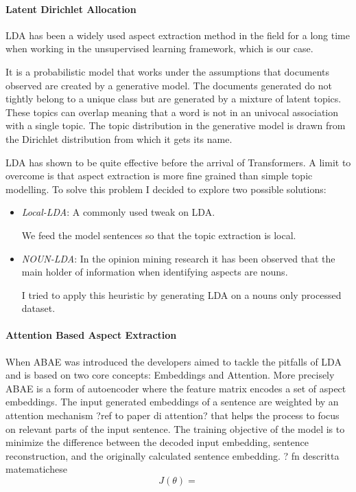 \paragraph{Latent Dirichlet Allocation}
LDA has been a widely used aspect extraction method in the field for a long time when working in the unsupervised
learning framework, which is our case.

It is a probabilistic model that works under the assumptions that documents observed are created by a generative model.
The documents generated do not tightly belong to a unique class but are generated by a mixture of latent topics.
These topics can overlap meaning that a word is not in an univocal association with a single topic.
The topic distribution in the generative model is drawn from the Dirichlet distribution from which it gets its name.

LDA has shown to be quite effective before the arrival of Transformers. A limit to overcome is that aspect extraction
is more fine grained than simple topic modelling. To solve this problem I decided to explore two possible solutions:
\begin{itemize}
    \item{\textit{Local-LDA}}: A commonly used tweak on LDA.

    We feed the model sentences so that the topic extraction is local.
    \item{\textit{NOUN-LDA}}: In the opinion mining research it has been observed that %
    the main holder of information when identifying aspects are nouns.

    I tried to apply this heuristic by generating LDA on a nouns only processed dataset.
\end{itemize}

\paragraph{Attention Based Aspect Extraction}
When ABAE was introduced the developers aimed to tackle the pitfalls of LDA and is based on two core concepts: Embeddings and Attention.
More precisely ABAE is a form of autoencoder where the feature matrix encodes a set of aspect embeddings.
The input generated embeddings of a sentence are weighted by an attention mechanism ?ref to paper di attention?
that helps the process to focus on relevant parts of the input sentence.
The training objective of the model is to minimize the difference between the decoded input embedding, sentence reconstruction,
and the originally calculated sentence embedding.
? fn descritta matematichese
$$J(\theta) = $$

